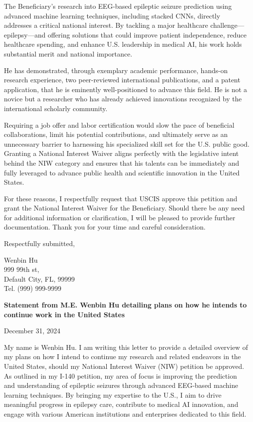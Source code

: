 \documentclass{article}
\begin{document}
The Beneficiary’s research into EEG-based epileptic seizure prediction using advanced machine learning techniques, including stacked CNNs, directly addresses a critical national interest. By tackling a major healthcare challenge—epilepsy—and offering solutions that could improve patient independence, reduce healthcare spending, and enhance U.S. leadership in medical AI, his work holds substantial merit and national importance.

He has demonstrated, through exemplary academic performance, hands-on research experience, two peer-reviewed international publications, and a patent application, that he is eminently well-positioned to advance this field. He is not a novice but a researcher who has already achieved innovations recognized by the international scholarly community.

Requiring a job offer and labor certification would slow the pace of beneficial collaborations, limit his potential contributions, and ultimately serve as an unnecessary barrier to harnessing his specialized skill set for the U.S. public good. Granting a National Interest Waiver aligns perfectly with the legislative intent behind the NIW category and ensures that his talents can be immediately and fully leveraged to advance public health and scientific innovation in the United States.

For these reasons, I respectfully request that USCIS approve this petition and grant the National Interest Waiver for the Beneficiary. Should there be any need for additional information or clarification, I will be pleased to provide further documentation.
Thank you for your time and careful consideration.

Respectfully submitted,

\vspace{5\baselineskip}

Wenbin Hu\\
999 99th st,\\
Default City, FL, 99999\\
Tel. (999) 999-9999




\clearpage

{\bf Statement from M.E. Wenbin Hu detailing plans on how he intends to continue work in the United States}

\label{plans}
December 31, 2024

My name is Wenbin Hu. I am writing this letter to provide a detailed overview of my plans on how I intend to continue my research and related endeavors in the United States, should my National Interest Waiver (NIW) petition be approved. As outlined in my I-140 petition, my area of focus is improving the prediction and understanding of epileptic seizures through advanced EEG-based machine learning techniques. By bringing my expertise to the U.S., I aim to drive meaningful progress in epilepsy care, contribute to medical AI innovation, and engage with various American institutions and enterprises dedicated to this field.
\end{document}
